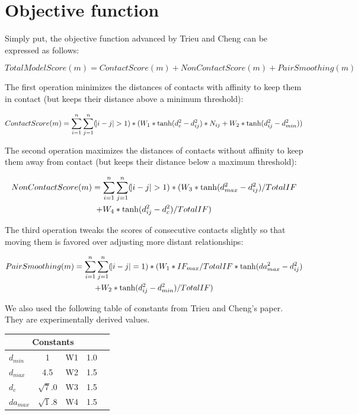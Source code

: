 \documentclass{article}
\begin{document}
\section{Objective function}

Simply put, the objective function advanced by Trieu and Cheng can be expressed as follows:

\begin{equation}
      TotalModelScore(m) = ContactScore(m) + NonContactScore(m) + PairSmoothing(m)
\end{equation}

The first operation minimizes the distances of contacts with affinity to keep them in contact (but keeps their distance above a minimum threshold):

\begin{equation}
      ContactScore(m) = \sum_{i=1}^{n} \sum_{j=1}^{n} (\abs{i-j}>1) * (W_1 * \tanh(d_c^2-d_{ij}^2) * N_{ij} + W_2 * \tanh(d_{ij}^2-d_{min}^2))
\end{equation}

The second operation maximizes the distances of contacts without affinity to keep them away from contact (but keeps their distance below a maximum threshold):

\begin{multline}
      NonContactScore(m) = \sum_{i=1}^{n} \sum_{j=1}^{n} (\abs{i-j}>1) * (W_3 * \tanh(d_{max}^2-d_{ij}^2) / TotalIF \\+ W_4 * \tanh(d_{ij}^2-d_{c}^2) / TotalIF)
\end{multline}

The third operation tweaks the scores of consecutive contacts slightly so that moving them is favored over adjusting more distant relationships:

\begin{multline}
      PairSmoothing(m) = \sum_{i=1}^{n} \sum_{j=1}^{n} (\abs{i-j}=1) * (W_1 * IF_{max} / TotalIF * \tanh(da_{max}^2-d_{ij}^2) \\+ W_2 * \tanh(d_{ij}^2-d_{min}^2) / TotalIF)
\end{multline}

We also used the following table of constants from Trieu and Cheng's paper.  They are experimentally derived values.

\begin{center}
\begin{tabular}{|l|c|c|c|r|}
\multicolumn{4}{c}{Constants} \\
    \hline
    $d_{min}$ & 1 & W1 & 1.0           \\ \hline
    $d_{max}$ & 4.5  & W2 & 1.5      \\ \hline
    $d_{c}$ & $\sqrt 7.0$  & W3 & 1.5            \\ \hline
    $da_{max}$ & $\sqrt 1.8$  & W4 & 1.5     \\ \hline
    \end{tabular}
\end{center}
\end{document}
